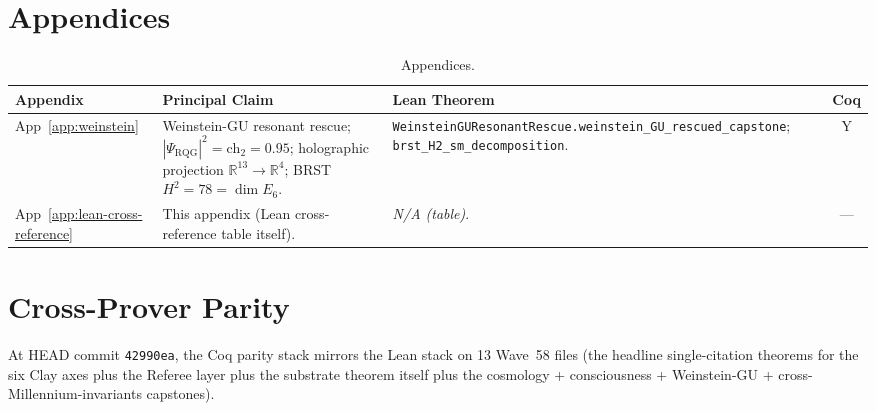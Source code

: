 \FloatBarrier

\section{Appendices}
\label{sec:lean-xref-appendices}

\begin{table}[h]
\centering
\footnotesize
\caption{Appendices.}
\begin{tabular}{p{2.1cm}p{4.2cm}p{5.2cm}c}
\toprule
\textbf{Appendix} & \textbf{Principal Claim} & \textbf{Lean Theorem} & \textbf{Coq} \\
\midrule
App~\ref{app:weinstein}
& Weinstein-GU resonant rescue; $|\Psi_{\text{RQG}}|^2 = \text{ch}_2 = 0.95$; holographic projection $\mathbb{R}^{13} \to \mathbb{R}^4$; BRST $H^2 = 78 = \dim E_6$.
& \texttt{WeinsteinGUResonantRescue.weinstein\_GU\_rescued\_capstone}; \texttt{brst\_H2\_sm\_decomposition}.
& Y \\
App~\ref{app:lean-cross-reference}
& This appendix (Lean cross-reference table itself).
& \textit{N/A (table)}.
& --- \\
\bottomrule
\end{tabular}
\end{table}

\FloatBarrier

\section{Cross-Prover Parity}
\label{sec:lean-cross-reference-coq-parity}

At HEAD commit \texttt{42990ea}, the Coq parity stack mirrors the
Lean stack on 13 Wave~58 files (the headline single-citation
theorems for the six Clay axes plus the Referee layer plus the
substrate theorem itself plus the cosmology + consciousness +
Weinstein-GU + cross-Millennium-invariants capstones).

